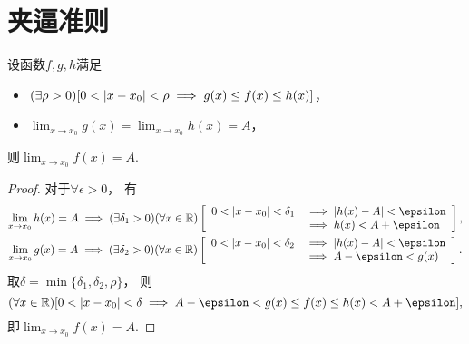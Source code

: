 \section{夹逼准则}
\begin{theorem}\label{theorem:函数极限.夹逼准则}
设函数\(f,g,h\)满足\begin{itemize}
	\item \((\exists\rho>0)
	[0<\abs{x-x_0}<\rho \implies g(x) \leq f(x) \leq h(x)]\)，
	\item \(\lim_{x \to x_0} g(x) = \lim_{x \to x_0} h(x) = A\)，
\end{itemize}
则\(\lim_{x \to x_0} f(x) = A\).
\begin{proof}
对于\(\forall\epsilon>0\)，
有\begin{gather*}
	\lim_{x \to x_0} h(x) = A
	\implies
	(\exists\delta_1>0)
	(\forall x\in\mathbb{R})
	\left[
		\begin{array}{rl}
			0<\abs{x-x_0}<\delta_1
			&\implies
			\abs{h(x)-A}<\epsilon \\
			&\implies
			h(x)<A+\epsilon
		\end{array}
	\right], \\
	\lim_{x \to x_0} g(x) = A
	\implies
	(\exists\delta_2>0)
	(\forall x\in\mathbb{R})
	\left[
		\begin{array}{rl}
			0<\abs{x-x_0}<\delta_2
			&\implies
			\abs{h(x)-A}<\epsilon \\
			&\implies
			A-\epsilon<g(x)
		\end{array}
	\right].
\end{gather*}
取\(\delta=\min\{\delta_1,\delta_2,\rho\}\)，
则\[
	(\forall x\in\mathbb{R})
	[
		0<\abs{x-x_0}<\delta
		\implies
		A-\epsilon < g(x) \leq f(x) \leq h(x) < A+\epsilon
	],
\]
即\(\lim_{x \to x_0} f(x) = A\).
\end{proof}
\end{theorem}

